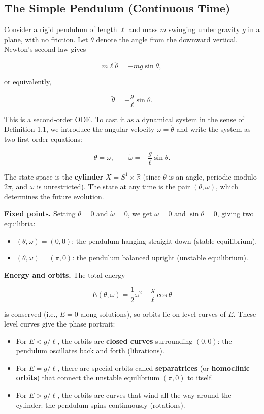 \subsection{The Simple Pendulum (Continuous Time)}\label{sec:1.4.2}

Consider a rigid pendulum of length $\ell$ and mass $m$ swinging under gravity $g$ in a plane, with no friction. Let $\theta$ denote the angle from the downward vertical. Newton's second law gives

\[
m\ell \ddot{\theta} = -mg \sin\theta,
\]

or equivalently,

\[
\ddot{\theta} = -\frac{g}{\ell}\sin\theta.
\]

This is a second-order ODE. To cast it as a dynamical system in the sense of Definition 1.1, we introduce the angular velocity $\omega = \dot{\theta}$ and write the system as two first-order equations:

\[
\dot{\theta} = \omega, \qquad \dot{\omega} = -\frac{g}{\ell}\sin\theta.
\]

The state space is the \textbf{cylinder} $X = S^1 \times \mathbb{R}$ (since $\theta$ is an angle, periodic modulo $2\pi$, and $\omega$ is unrestricted). The state at any time is the pair $(\theta, \omega)$, which determines the future evolution.

\textbf{Fixed points.} Setting $\dot{\theta} = 0$ and $\dot{\omega} = 0$, we get $\omega = 0$ and $\sin\theta = 0$, giving two equilibria:

\begin{itemize}[nosep]
  \item $(\theta, \omega) = (0, 0)$: the pendulum hanging straight down (stable equilibrium).
  \item $(\theta, \omega) = (\pi, 0)$: the pendulum balanced upright (unstable equilibrium).
\end{itemize}

\textbf{Energy and orbits.} The total energy

\[
E(\theta, \omega) = \frac{1}{2}\omega^2 - \frac{g}{\ell}\cos\theta
\]

is conserved (i.e., $\dot{E} = 0$ along solutions), so orbits lie on level curves of $E$. These level curves give the phase portrait:

\begin{itemize}[nosep]
  \item For $E < g/\ell$, the orbits are \textbf{closed curves} surrounding $(0,0)$: the pendulum oscillates back and forth (librations).
  \item For $E = g/\ell$, there are special orbits called \textbf{separatrices} (or \textbf{homoclinic orbits}) that connect the unstable equilibrium $(\pi, 0)$ to itself.
  \item For $E > g/\ell$, the orbits are curves that wind all the way around the cylinder: the pendulum spins continuously (rotations).
\end{itemize}

